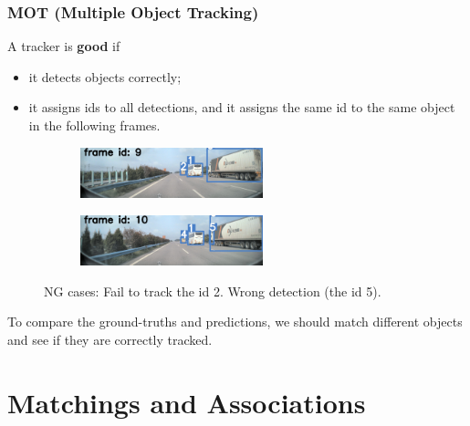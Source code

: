 \documentclass[slidetop, mathserif]{beamer}
\begin{document}
\begin{frame}
	\frametitle{MOT (Multiple Object Tracking)}

	A tracker is {\bf good} if
	\begin{itemize}
	\item it detects objects correctly;
	\item
		it assigns ids to all detections,
		and it assigns the same id to the same object in the following frames.
	\end{itemize}

	\begin{figure}
		\begin{subfigure}{.48\textwidth}
		\includegraphics[width=150pt]{pics/track03.jpg}
		\end{subfigure}
		\begin{subfigure}{.48\textwidth}
		\includegraphics[width=150pt]{pics/track04.jpg}
		\end{subfigure}
		\caption{NG cases: Fail to track the id 2. Wrong detection (the id 5).}
	\end{figure}

	\vspace{-15pt}
	To compare the ground-truths and predictions, we should match different objects
	and see if they are correctly tracked.


\end{frame}


\section{Matchings and Associations}
\end{document}
